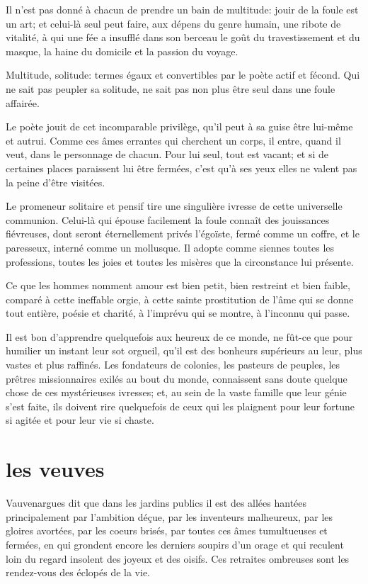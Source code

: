 Il n’est pas donné à chacun de prendre un bain de
multitude: jouir de la foule est un art; et celui{}-là seul peut faire,
aux dépens du genre humain, une ribote de vitalité, à qui une fée a
insufflé dans son berceau le goût du travestissement et du masque, la
haine du domicile et la passion du voyage.

Multitude, solitude: termes égaux et convertibles par le poète actif et
fécond. Qui ne sait pas peupler sa solitude, ne sait pas non plus être
seul dans une foule affairée.

Le poète jouit de cet incomparable privilège, qu’il
peut à sa guise être lui{}-même et autrui. Comme ces âmes errantes qui
cherchent un corps, il entre, quand il veut, dans le personnage de
chacun. Pour lui seul, tout est vacant; et si de certaines places
paraissent lui être fermées, c’est
qu’à ses yeux elles ne valent pas la peine
d’être visitées.

Le promeneur solitaire et pensif tire une singulière ivresse de cette
universelle communion. Celui{}-là qui épouse facilement la foule
connaît des jouissances fiévreuses, dont seront éternellement privés
l’égoïste, fermé comme un coffre, et le paresseux,
interné comme un mollusque. Il adopte comme siennes toutes les
professions, toutes les joies et toutes les misères que la circonstance
lui présente.

Ce que les hommes nomment amour est bien petit, bien restreint et bien
faible, comparé à cette ineffable orgie, à cette sainte prostitution de
l’âme qui se donne tout entière, poésie et charité, à
l’imprévu qui se montre, à l’inconnu
qui passe.

\quebra
Il est bon d’apprendre quelquefois aux heureux de ce
monde, ne fût{}-ce que pour humilier un instant leur sot orgueil,
qu’il est des bonheurs supérieurs au leur, plus vastes
et plus raffinés. Les fondateurs de colonies, les pasteurs de peuples,
les prêtres missionnaires exilés au bout du monde, connaissent sans
doute quelque chose de ces mystérieuses ivresses; et, au sein de la
vaste famille que leur génie s’est faite, ils doivent
rire quelquefois de ceux qui les plaignent pour leur fortune si agitée
et pour leur vie si chaste.

\quebra\section[Les veuves]{les veuves}

Vauvenargues dit que dans les jardins publics il est des allées hantées
principalement par l’ambition déçue, par les
inventeurs malheureux, par les gloires avortées, par les coeurs brisés,
par toutes ces âmes tumultueuses et fermées, en qui grondent encore les
derniers soupirs d’un orage et qui reculent loin du
regard insolent des joyeux et des oisifs. Ces retraites ombreuses sont
les rendez{}-vous des éclopés de la vie.


